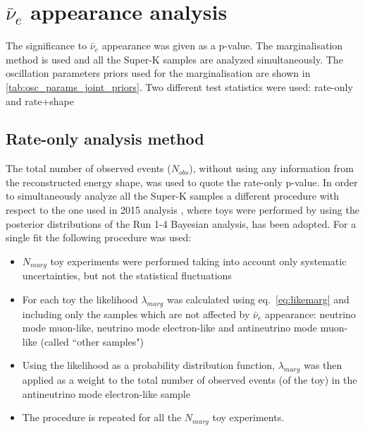 \clearpage


\section {$\bar{\nu}_e$ appearance analysis}
\label{sec:nuebarapp}

The significance to $\bar{\nu}_e$ appearance was given as a p-value.
The marginalisation method is used and all the Super-K samples are analyzed simultaneously.
The oscillation parameters priors used for the marginalisation are shown in \cref{tab:osc_params_joint_priors}.
Two different test statistics were used: rate-only and rate+shape

\subsection{Rate-only analysis method}
\label{sec:nuebarapp_rateonly}

The total number of observed events ($N_{obs}$), without using any information from the 
reconstructed energy shape, was used to quote the rate-only p-value. 
In order to simultaneously analyze 
all the Super-K samples a different procedure with respect to the one used in 2015 analysis
\cite{OurRun56AntiNueBarAppearanceAnalysis3Flavour}, 
where toys were performed by using the posterior distributions of the Run 1-4 Bayesian analysis,
has been adopted. 
For a single fit the following procedure was used:

\begin{itemize}
\item $N_{marg}$ toy experiments were performed taking into account only systematic uncertainties, but not the statistical fluctuations
\item For each toy the likelihood $\lambda_{marg}$ was calculated using eq.~\ref{eq:likemarg} and including only the samples which are not 
	affected by $\bar{\nu}_e$ appearance: neutrino mode muon-like, neutrino mode electron-like and antineutrino mode muon-like (called ``other samples")
\item Using the likelihood as a probability distribution function, 
	$\lambda_{marg}$ was then applied as a weight to the total number of observed events (of the toy) in the antineutrino mode electron-like sample
\item The procedure is repeated for all the $N_{marg}$ toy experiments. 
\end{itemize}

